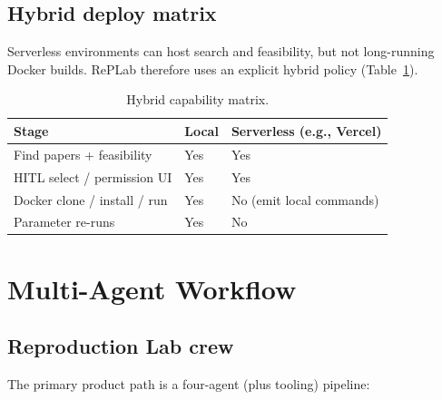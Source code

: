\documentclass[11pt,a4paper]{article}
\begin{document}
\subsection{Hybrid deploy matrix}
Serverless environments can host search and feasibility, but not long-running
Docker builds. RePLab therefore uses an explicit hybrid policy
(Table~\ref{tab:hybrid}).

\begin{table}[ht]
\centering
\caption{Hybrid capability matrix.}
\label{tab:hybrid}
\begin{tabular}{@{}lll@{}}
\toprule
\textbf{Stage} & \textbf{Local} & \textbf{Serverless (e.g., Vercel)} \\
\midrule
Find papers + feasibility & Yes & Yes \\
HITL select / permission UI & Yes & Yes \\
Docker clone / install / run & Yes & No (emit local commands) \\
Parameter re-runs & Yes & No \\
\bottomrule
\end{tabular}
\end{table}

\section{Multi-Agent Workflow}
\label{sec:workflow}

\subsection{Reproduction Lab crew}
The primary product path is a four-agent (plus tooling) pipeline:
\end{document}
